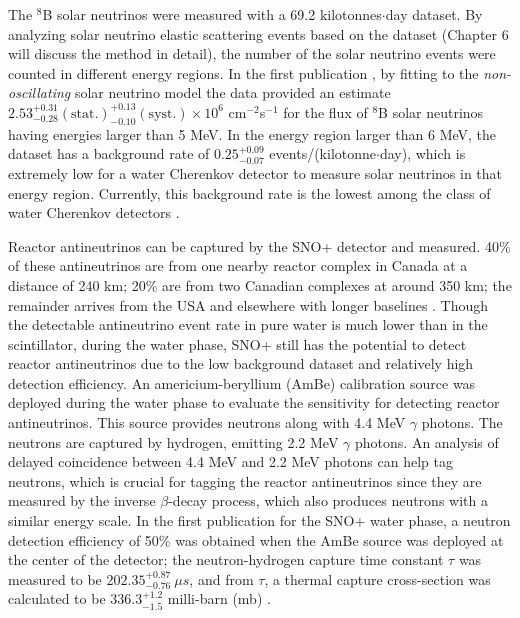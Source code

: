 The $^8$B solar neutrinos were measured with a 69.2 kilotonnes$\cdot$day dataset. By analyzing solar neutrino elastic scattering events based on the dataset (Chapter 6 will discuss the method in detail), the number of the solar neutrino events were counted in different energy regions. In the first publication \cite{anderson2019measurement}, by fitting to the {\em non-oscillating} solar neutrino model the data provided an estimate $2.53^{+0.31}_{-0.28}\mathrm{(stat.)}^{+0.13}_{-0.10}\mathrm{(syst.)}\times 10^6$ cm$^{-2}$s$^{-1}$ for the flux of $^8$B solar neutrinos having energies larger than 5 MeV. In the energy region larger than 6 MeV, the dataset has a background rate of $0.25^{+0.09}_{-0.07}$ events/(kilotonne$\cdot$day)\cite{anderson2019measurement}, which is extremely low for a water Cherenkov detector to measure solar neutrinos in that energy region. Currently, this background rate is the lowest among the class of water Cherenkov detectors \cite{anderson2019measurement}. 

Reactor antineutrinos can be captured by the SNO+ detector and measured. 40\% of these antineutrinos are from one nearby reactor complex in Canada at a distance of 240 km; 20\% are from two Canadian complexes at around 350 km; the remainder arrives from the USA and elsewhere with longer baselines \cite{whitepaper}. Though the detectable antineutrino event rate in pure water is much lower than in the scintillator, during the water phase, SNO+ still has the potential to detect reactor antineutrinos due to the low background dataset and relatively high detection efficiency. An americium-beryllium (AmBe) calibration source was deployed during the water phase to evaluate the sensitivity for detecting reactor antineutrinos. This source provides neutrons along with 4.4 MeV $\gamma$ photons. The neutrons are captured by hydrogen, emitting 2.2 MeV $\gamma$ photons. An analysis of delayed coincidence between 4.4 MeV and 2.2 MeV photons can help tag neutrons, which is crucial for tagging the reactor antineutrinos since they are measured by the inverse $\beta$-decay process, which also produces neutrons with a similar energy scale. In the first publication for the SNO+ water phase, a neutron detection efficiency of 50\% was obtained when the AmBe source was deployed at the center of the detector; the neutron-hydrogen capture time constant $\tau$ was measured to be $202.35_{-0.76}^{+0.87}~\mu s$, and from $\tau$, a thermal capture cross-section was calculated to be $336.3^{+1.2}_{-1.5}$ milli-barn (mb) \cite{anderson2020measurement}.

